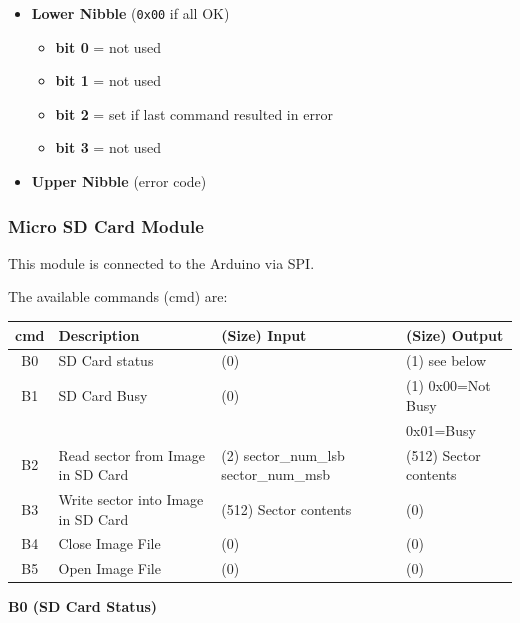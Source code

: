 \documentclass[a4paper,11pt]{article}
\begin{document}
     \begin{itemize}
        \item \textbf{Lower Nibble} (\texttt{0x00} if all OK)
        \begin{itemize}
            \item \textbf{bit 0} = not used
            \item \textbf{bit 1} = not used
            \item \textbf{bit 2} = set if last command resulted in error
            \item \textbf{bit 3} = not used
        \end{itemize}
        \item \textbf{Upper Nibble} (error code)
    \end{itemize}

    \subsubsection{Micro SD Card Module}

    This module is connected to the Arduino via SPI.

    The available commands (cmd) are:

    \begin{tabular}{| c | m{3.8cm} | m{3cm} | m{3.5cm} | }
        \hline
        \rowcolor{lightgray}
        cmd & Description & (Size) Input & (Size) Output\\
        \hline
        B0 & SD Card status & (0) & (1) see below\\
        \hline
        B1 & SD Card Busy & (0) & (1) 0x00=Not Busy\\
           &              &     &     0x01=Busy\\
        \hline
        B2 & Read sector from Image in SD Card & (2) sector\_num\_lsb sector\_num\_msb & (512) Sector contents\\
        \hline
        B3 & Write sector into Image in SD Card & (512) Sector contents & (0) \\
        \hline
        B4 & Close Image File & (0) & (0)\\
        \hline
        B5 & Open Image File & (0) & (0)\\
        \hline
    \end{tabular}

    \textbf{B0 (SD Card Status)}
\end{document}
